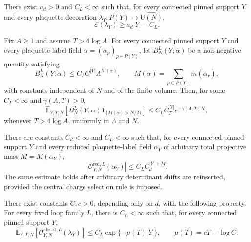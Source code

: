 \documentclass[10pt,a4paper]{amsart}
\newcommand\E{{\mathbb E}}
\newcommand\U{{\mathrm U}}
\begin{document}
\begin{lemma}
\label{lem:minimal-support-size}
There exist $a_d>0$ and $C_L<\infty$ such that, for every connected pinned support $Y$ and every plaquette decoration $\lambda_Y:P(Y)\to\widehat{\U(N)}$,
\[
\mathcal{E}(\lambda_Y)\ge a_d |Y|-C_L .
\]
\end{lemma}

\begin{proposition}\label{prop:nonstable-polymer-tail}
Fix $A\ge1$ and assume $T>4\log A$.  For every connected pinned support $Y$ and every plaquette label field $\alpha=(\alpha_p)_{p\in P(Y)}$, let $B_N^L(Y;\alpha)$ be a non-negative quantity satisfying
\begin{equation}
\label{eq:nonspectral-growth-assumption}
B_N^L(Y;\alpha)
\le
C_LC^{|Y|}A^{M(\alpha)},
\qquad
M(\alpha)=\sum_{p\in P(Y)}m(\alpha_p),
\end{equation}
with constants independent of $N$ and of the finite volume.  Then, for some $C_T<\infty$ and $\gamma(A,T)>0$,
\begin{equation}\label{eq:nonstable-polymer-tail-under-P}
\widehat\E_{Y,T,N}\left[
B_N^L(Y;\alpha)
\mathbf 1_{\{M(\alpha)>N/2\}}
\right]
\le
C_L C_T^{|Y|}e^{-\gamma(A,T)N},
\end{equation}
whenever $T>4\log A$, uniformly in $\Lambda$ and $N$.
\end{proposition}

\begin{corollary}\label{cor:coarse-nonspectral-block}
There are constants $C_d<\infty$ and $C_L<\infty$ such that, for every connected pinned support $Y$ and every reduced plaquette-label field $\alpha_Y$ of arbitrary total projective mass
$M=M(\alpha_Y)$,
\begin{equation}\label{eq:coarse-nonspectral-block}
\left|\mathcal O_{Y,N}^{\mathrm{red},L}(\alpha_Y)\right|
\le C_LC_d^{|Y|+M}.
\end{equation}
The same estimate holds after arbitrary determinant shifts are reinserted, provided the central charge selection rule is imposed.
\end{corollary}

\begin{theorem}
\label{thm:stable-hk-block}
There exist constants $C,c>0$, depending only on $d$, with the following property.  For every fixed loop family $L$, there is $C_L<\infty$ such that, for every connected pinned support $Y$,
\begin{equation}
\label{eq:stable-hk-block}
\widehat\E_{Y,T,N}\left[
\mathcal O_{Y,N}^{\mathrm{abs},\mathrm{st},L}(\lambda_Y)
\right]
\le
C_L\exp\{-\mu(T)|Y|\},
\qquad
\mu(T)=cT-\log C .
\end{equation}

\end{theorem}
\end{document}
